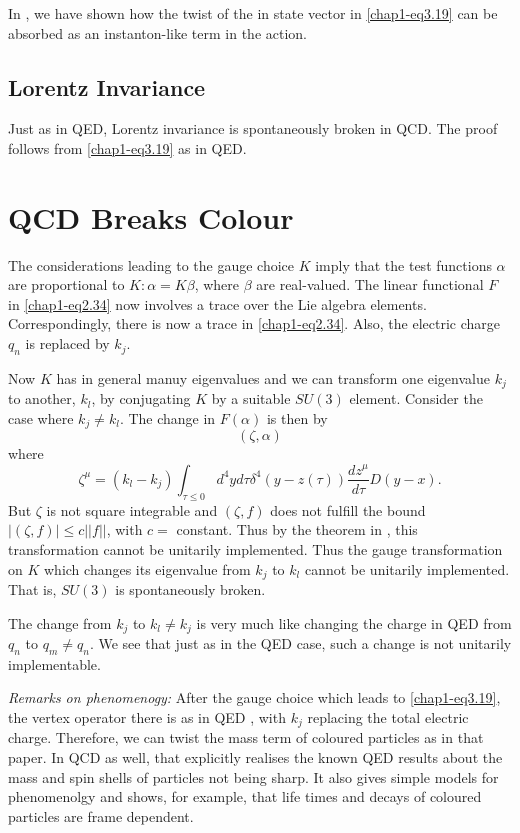 In \cite{key4}, we have shown how the twist of the in state vector in \eqref{chap1-eq3.19} can be absorbed as an instanton-like term in the action.

\subsection{Lorentz Invariance}\label{chap1-sec3.2}

Just as in QED, Lorentz invariance is spontaneously broken in QCD. The proof follows from \eqref{chap1-eq3.19} as in QED.

\section{QCD Breaks Colour}\label{chap1-sec4}

The considerations leading to the gauge choice $K$ imply that the test functions $\alpha$ are proportional to $K: \alpha = K \beta$, where $\beta$ are real-valued. The linear functional $F$ in \eqref{chap1-eq2.34} now involves a trace over the Lie algebra elements. Correspondingly, there is now a trace in \eqref{chap1-eq2.34}. Also, the electric charge $q_n$ is replaced by $k_j$.

Now $K$ has in general manuy eigenvalues and we can transform one eigenvalue $k_j$ to another, $k_l$, by conjugating $K$ by a suitable $SU(3)$ element. Consider the case where $k_j \neq k_l$. The change in $F(\alpha)$ is then by
\begin{equation}
(\zeta, \alpha) \label{chap1-eq4.1}
\end{equation}
where
\begin{equation}
  \zeta^\mu = (k_l - k_j) \int_{\tau \leq 0} d^4 y d\tau \delta^4 (y -z(\tau)) \frac{dz^\mu}{d \tau} D (y-x). \label{chap1-eq4.2}
\end{equation}
But $\zeta$ is not square integrable and $(\zeta, f)$ does not fulfill the bound $|(\zeta, f)|\leq c || f ||$, with $c=$ constant. Thus by the theorem in \cite{key6}, this transformation cannot be unitarily implemented. Thus the gauge transformation on $K$ which changes its eigenvalue from $k_j$ to $k_l$ cannot be unitarily implemented. That is, $SU(3)$ is spontaneously broken.

The change from $k_j$ to $k_l \neq k_j$ is very much like changing the charge in QED from $q_n$ to $q_m \neq q_n$. We see that just as in the QED case, such a change is not unitarily implementable.

\textit{Remarks on phenomenogy:} After the gauge choice which leads to \eqref{chap1-eq3.19}, the vertex operator there is as in QED \cite{key4}, with $k_j$ replacing the total electric charge. Therefore, we can twist the mass term of coloured particles as in that paper. In QCD as well, that explicitly realises the known QED results \cite{key2, key3} about the mass and spin shells of particles not being sharp. It also gives simple models for phenomenolgy and shows, for example, that life times and decays of coloured particles are frame dependent.

